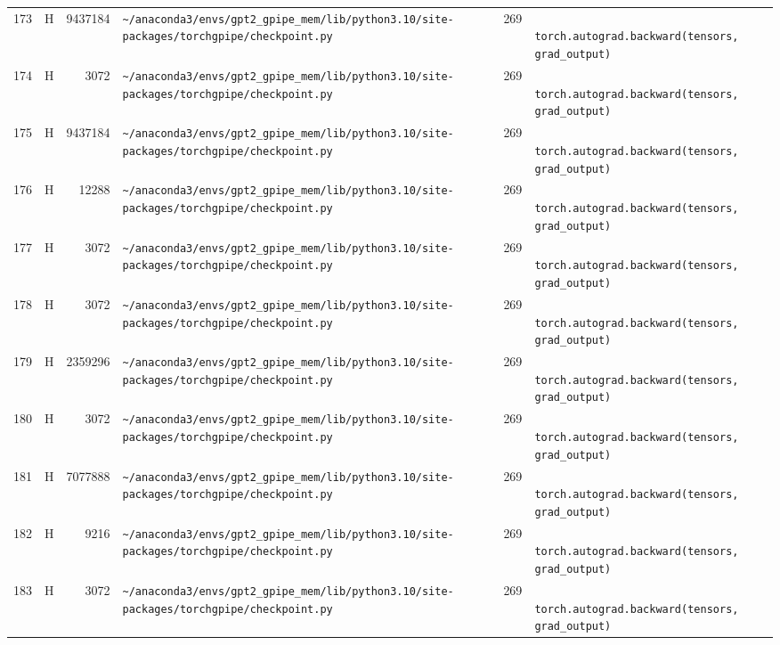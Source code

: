 \documentclass{article}
\begin{document}
\begin{longtable}{r l r p{6.5cm} r p{7.0cm}}
173 & H & 9437184 & \lstinline|~/anaconda3/envs/gpt2_gpipe_mem/lib/python3.10/site-packages/torchgpipe/checkpoint.py| & 269 & \lstinline|            torch.autograd.backward(tensors, grad_output)| \\
174 & H & 3072 & \lstinline|~/anaconda3/envs/gpt2_gpipe_mem/lib/python3.10/site-packages/torchgpipe/checkpoint.py| & 269 & \lstinline|            torch.autograd.backward(tensors, grad_output)| \\
175 & H & 9437184 & \lstinline|~/anaconda3/envs/gpt2_gpipe_mem/lib/python3.10/site-packages/torchgpipe/checkpoint.py| & 269 & \lstinline|            torch.autograd.backward(tensors, grad_output)| \\
176 & H & 12288 & \lstinline|~/anaconda3/envs/gpt2_gpipe_mem/lib/python3.10/site-packages/torchgpipe/checkpoint.py| & 269 & \lstinline|            torch.autograd.backward(tensors, grad_output)| \\
177 & H & 3072 & \lstinline|~/anaconda3/envs/gpt2_gpipe_mem/lib/python3.10/site-packages/torchgpipe/checkpoint.py| & 269 & \lstinline|            torch.autograd.backward(tensors, grad_output)| \\
178 & H & 3072 & \lstinline|~/anaconda3/envs/gpt2_gpipe_mem/lib/python3.10/site-packages/torchgpipe/checkpoint.py| & 269 & \lstinline|            torch.autograd.backward(tensors, grad_output)| \\
179 & H & 2359296 & \lstinline|~/anaconda3/envs/gpt2_gpipe_mem/lib/python3.10/site-packages/torchgpipe/checkpoint.py| & 269 & \lstinline|            torch.autograd.backward(tensors, grad_output)| \\
180 & H & 3072 & \lstinline|~/anaconda3/envs/gpt2_gpipe_mem/lib/python3.10/site-packages/torchgpipe/checkpoint.py| & 269 & \lstinline|            torch.autograd.backward(tensors, grad_output)| \\
181 & H & 7077888 & \lstinline|~/anaconda3/envs/gpt2_gpipe_mem/lib/python3.10/site-packages/torchgpipe/checkpoint.py| & 269 & \lstinline|            torch.autograd.backward(tensors, grad_output)| \\
182 & H & 9216 & \lstinline|~/anaconda3/envs/gpt2_gpipe_mem/lib/python3.10/site-packages/torchgpipe/checkpoint.py| & 269 & \lstinline|            torch.autograd.backward(tensors, grad_output)| \\
183 & H & 3072 & \lstinline|~/anaconda3/envs/gpt2_gpipe_mem/lib/python3.10/site-packages/torchgpipe/checkpoint.py| & 269 & \lstinline|            torch.autograd.backward(tensors, grad_output)| \\

\end{longtable}
\end{document}
